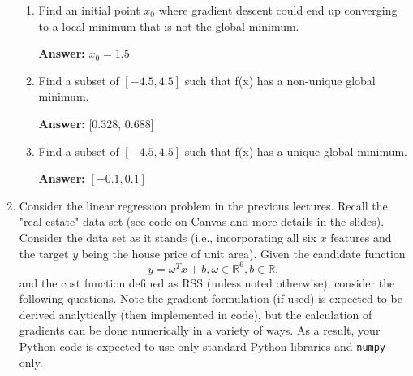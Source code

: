 \documentclass{assignment}
\newcommand{\R}{\mathbb{R}}
\begin{document}
\begin{problem}
\begin{enumerate}
\begin{enumerate}[label=(\alph*)]

        
        \item Find an initial point $x_0$ where gradient descent could end up converging to a local minimum that is not the global minimum.

        \color{blue}\textbf{Answer:} $x_0 = 1.5$ \color{black}


        
        \item Find a subset of $[-4.5, 4.5]$ such that f(x) has a non-unique global minimum.

        \color{blue}\textbf{Answer:} [0.328, 0.688] \color{black}


        
        \item Find a subset of $[-4.5, 4.5]$ such that f(x) has a unique global minimum.

        \color{blue}\textbf{Answer:} $[-0.1, 0.1]$\color{black}


    \end{enumerate}


    \item Consider the linear regression problem in the previous lectures. Recall the "real estate" data set (see code on Canvas and more details in the slides). Consider the data set as it stands (i.e., incorporating all six $x$ features and the target $y$ being the house price of unit area). Given the candidate function
    \begin{displaymath}
        y = \omega^Tx + b, \omega \in \R^6, b \in \R,
        \tag*{(1-4)}
    \end{displaymath}
    and the cost function defined as RSS (unless noted otherwise), consider the following questions. Note the gradient formulation (if used) is expected to be derived analytically (then implemented in code), but the calculation of gradients can be done numerically in a variety of ways. As a result, your Python code is expected to use only standard Python libraries and \texttt{numpy} only.
    

\end{enumerate}
\end{problem}
\end{document}
